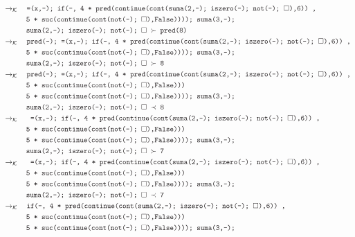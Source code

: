 \documentclass{article}
\newcommand{\tx}[1]{\textcolor{Black} {\texttt{#1}}}
\newcommand{\es}{$\square$}
\newcommand{\kr}{\rightarrow_{\mathcal{K}} \quad}
\begin{document}
\begin{enumerate}
\begin{enumerate}
\begin{align*}
			&\kr \tx{=(x,-); if(-, 4 * pred(continue(cont(suma(2,-); iszero(-); not(-); \es),6)) ,}\\
			&\tx {\quad \quad \quad 5 * suc(continue(cont(not(-); \es),False)))); suma(3,-);}\\
			&\tx{\quad \quad \quad suma(2,-); iszero(-); not(-); \es $\ \succ $ pred(8)} \\
			&\kr \tx{pred(-); =(x,-); if(-, 4 * pred(continue(cont(suma(2,-); iszero(-); not(-); \es),6)) ,}\\
			&\tx {\quad \quad \quad 5 * suc(continue(cont(not(-); \es),False)))); suma(3,-);}\\
			&\tx{\quad \quad \quad suma(2,-); iszero(-); not(-); \es $\ \succ $ 8} \\
			&\kr \tx{pred(-); =(x,-); if(-, 4 * pred(continue(cont(suma(2,-); iszero(-); not(-); \es),6)) ,}\\
			&\tx{\quad \quad \quad 5 * suc(continue(cont(not(-); \es),False)))}\\
			&\tx {\quad \quad \quad 5 * suc(continue(cont(not(-); \es),False)))); suma(3,-);}\\
			&\tx{\quad \quad \quad suma(2,-); iszero(-); not(-); \es $\ \prec $ 8} \\
			&\kr \tx{ =(x,-); if(-, 4 * pred(continue(cont(suma(2,-); iszero(-); not(-); \es),6)) ,}\\
			&\tx{\quad \quad \quad 5 * suc(continue(cont(not(-); \es),False)))}\\
			&\tx {\quad \quad \quad 5 * suc(continue(cont(not(-); \es),False)))); suma(3,-);}\\
			&\tx{\quad \quad \quad suma(2,-); iszero(-); not(-); \es $\ \succ $ 7} \\
			&\kr \tx{ =(x,-); if(-, 4 * pred(continue(cont(suma(2,-); iszero(-); not(-); \es),6)) ,}\\
			&\tx{\quad \quad \quad 5 * suc(continue(cont(not(-); \es),False)))}\\
			&\tx {\quad \quad \quad 5 * suc(continue(cont(not(-); \es),False)))); suma(3,-);}\\
			&\tx{\quad \quad \quad suma(2,-); iszero(-); not(-); \es $\ \prec $ 7} \\
			&\kr \tx{if(-, 4 * pred(continue(cont(suma(2,-); iszero(-); not(-); \es),6)) ,}\\
			&\tx{\quad \quad \quad 5 * suc(continue(cont(not(-); \es),False)))}\\
			&\tx {\quad \quad \quad 5 * suc(continue(cont(not(-); \es),False)))); suma(3,-);}\\

\end{align*}
\end{enumerate}
\end{enumerate}
\end{document}
